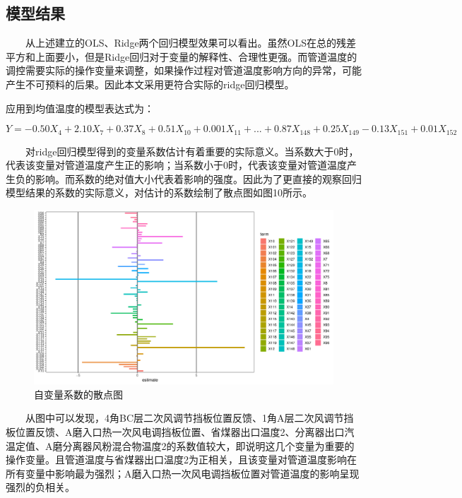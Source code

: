 \documentclass[
]{article}
\begin{document}
\hypertarget{ux6a21ux578bux7ed3ux679c}{%
\subsection{模型结果}\label{ux6a21ux578bux7ed3ux679c}}

  从上述建立的OLS、Ridge两个回归模型效果可以看出。虽然OLS在总的残差平方和上面要小，但是Ridge回归对于变量的解释性、合理性更强。而管道温度的调控需要实际的操作变量来调整，如果操作过程对管道温度影响方向的异常，可能产生不可预料的后果。因此本文采用更符合实际的ridge回归模型。

应用到均值温度的模型表达式为：

\[Y=-0.50X_4+2.10X_7+0.37X_8+0.51X_{10}+0.001X_{11}+...+0.87X_{148}+0.25X_{149}-0.13X_{151}+0.01X_{152}\]

  对ridge回归模型得到的变量系数估计有着重要的实际意义。当系数大于0时，代表该变量对管道温度产生正的影响；当系数小于0时，代表该变量对管道温度产生负的影响。而系数的绝对值大小代表着影响的强度。因此为了更直接的观察回归模型结果的系数的实际意义，对估计的系数绘制了散点图如图10所示。

\begin{figure}

{\centering \includegraphics{TJRJCP_DuXingx_202105_files/figure-latex/unnamed-chunk-27-1} 

}

\caption{自变量系数的散点图}\label{fig:unnamed-chunk-27}
\end{figure}

  从图中可以发现，4角BC层二次风调节挡板位置反馈、1角A层二次风调节挡板位置反馈、A磨入口热一次风电调挡板位置、省煤器出口温度2、分离器出口汽温定值、A磨分离器风粉混合物温度2的系数值较大，即说明这几个变量为重要的操作变量。且管道温度与省煤器出口温度2为正相关，且该变量对管道温度影响在所有变量中影响最为强烈；A磨入口热一次风电调挡板位置对管道温度的影响呈现强烈的负相关。
\end{document}
